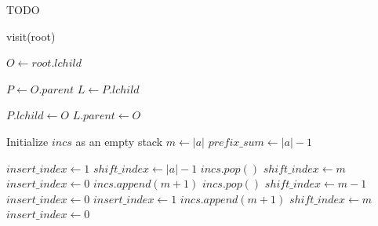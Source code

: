 \begin{algorithm}
    \begin{algorithmic}

	TODO

	\State visit(root)


	\State $O\gets root.lchild$
	\State {}



		\State $P \gets O.parent$
		\State $L \gets P.lchild$

		\State $P.lchild \gets O$
		\State $L.parent \gets O$
	    \EndIf

        \EndWhile
        
        
        
        \State Initialize $incs$ as an empty stack
        \State $m \gets |a|$
        \State $prefix\_sum \gets |a|-1$
        \vspace{0.75em}
        
                \State $insert\_index \gets 1$
                \State $shift\_index \gets |a| - 1$
                    \State $incs.pop()$
                \EndIf
                \State $shift\_index \gets m$
                \State $insert\_index \gets 0$
                \State $incs.append(m+1)$
                    \State $incs.pop()$
                \EndIf
                \State $shift\_index \gets m - 1$
                    \State $insert\_index \gets 0$
                \Else 
                    \State $insert\_index \gets 1$
                \EndIf
                \State $incs.append(m+1)$
            \Else
                \State $shift\_index \gets m$
                \State $insert\_index \gets 0$
            
            \EndIf
            

\end{algorithmic}
\end{algorithm}
